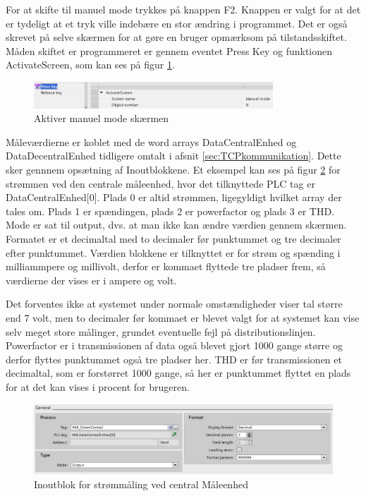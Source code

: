 For at skifte til manuel mode trykkes på knappen F2. Knappen er valgt for at det er tydeligt at et tryk ville indebære en stor ændring i programmet. Det er også skrevet på selve skærmen for at gøre en bruger opmærksom på tilstandsskiftet. Måden skiftet er programmeret er gennem eventet Press Key og funktionen ActivateScreen, som kan ses på figur \ref{fig:ActivateScreen}.

\begin{figure}[H] %
	\centering
	\includegraphics[width=0.8\textwidth]{Figure/ActivateScreen}
	\caption{Aktiver manuel mode skærmen}
	\label{fig:ActivateScreen}
\end{figure}

Måleværdierne er koblet med de word arrays DataCentralEnhed og DataDecentralEnhed tidligere omtalt i afsnit \ref{sec:TCPkommunikation}. Dette sker gennnem opsætning af Inoutblokkene. Et eksempel kan ses på figur \ref{fig:OutputblokMaelingStroemCentral} for strømmen ved den centrale måleenhed, hvor det tilknyttede PLC tag er DataCentralEnhed[0]. Plads 0 er altid strømmen, ligegyldigt hvilket array der tales om. Plads 1 er spændingen, plads 2 er powerfactor og plads 3 er THD. Mode er sat til output, dvs. at man ikke kan ændre værdien gennem skærmen. Formatet er et decimaltal med to decimaler før punktummet og tre decimaler efter punktummet.
Værdien blokkene er tilknyttet er for strøm og spænding i milliammpere og millivolt, derfor er kommaet flyttede tre pladser frem, så værdierne der vises er i ampere og volt.


Det forventes ikke at systemet under normale omstændigheder viser tal større end 7 volt, men to decimaler før kommaet er blevet valgt for at systemet kan vise selv meget store målinger, grundet eventuelle fejl på distributionslinjen. Powerfactor er i transmissionen af data også blevet gjort 1000 gange større og derfor flyttes punktummet også tre pladser her. THD er før transmissionen et decimaltal, som er forstørret 1000 gange, så her er punktummet flyttet en plads for at det kan vises i procent for brugeren.

\begin{figure}[H] %
	\centering
	\includegraphics[width=1\textwidth]{Figure/OutputblokMaelingStroemCentral}
	\caption{Inoutblok for strømmåling ved central Måleenhed}
	\label{fig:OutputblokMaelingStroemCentral}
\end{figure}

